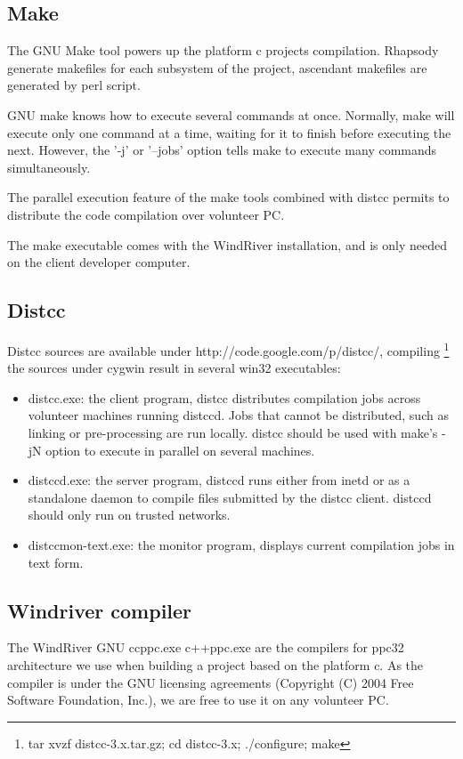 \documentclass{article}
\begin{document}
\subsection{Make}
The GNU Make tool powers up the platform c projects compilation. Rhapsody 
generate makefiles for each subsystem of the project, ascendant makefiles are generated
by perl script.

GNU make knows how to execute several commands at once. Normally, make will execute
only one command at a time, waiting for it to finish before executing the next. However,
the '-j' or '--jobs' option tells make to execute many commands simultaneously.

The parallel execution feature of the make tools combined with distcc permits
to distribute the code compilation over volunteer PC.

The make executable comes with the WindRiver installation, and is only needed on
the client developer computer.

\subsection{Distcc}
Distcc sources are available under http://code.google.com/p/distcc/,
compiling \footnote{tar xvzf distcc-3.x.tar.gz; cd distcc-3.x;
./configure; make} the sources under cygwin result in
several win32 executables:

\begin{itemize}
  \item distcc.exe: the client program, distcc distributes compilation jobs across volunteer machines running
distccd. Jobs that cannot be distributed, such as linking or pre-processing are run locally.  distcc should be used with make's -jN
option to execute in parallel on several machines.  
  \item distccd.exe: the server program, distccd runs either from inetd or as a
  standalone daemon to compile files submitted by the distcc client. distccd
  should only run on trusted networks.
  \item distccmon-text.exe: the monitor program, displays current compilation jobs in text form.
\end{itemize}

\subsection{Windriver compiler}

The WindRiver GNU ccppc.exe c++ppc.exe are the compilers for ppc32 architecture
we use when building a project based on the platform c.
As the compiler is under the GNU licensing agreements (Copyright (C) 2004 Free Software Foundation, Inc.), we are free to use it on
any volunteer PC.
\end{document}
